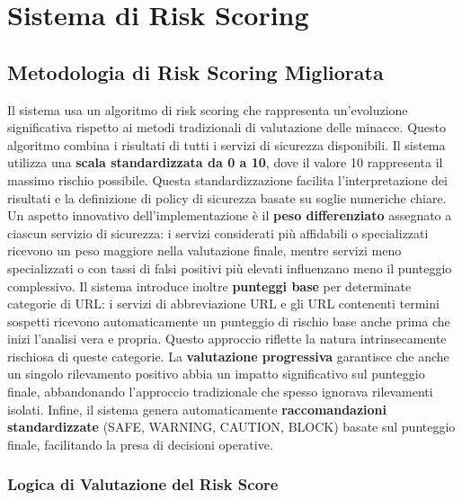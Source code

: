 \documentclass{article}
\begin{document}
\section{Sistema di Risk Scoring}

\subsection{Metodologia di Risk Scoring Migliorata}

Il sistema usa un algoritmo di risk scoring che rappresenta un'evoluzione significativa rispetto ai metodi tradizionali di valutazione delle minacce. Questo algoritmo combina i risultati di tutti i servizi di sicurezza disponibili.
\newline \newline
Il sistema utilizza una \textbf{scala standardizzata da 0 a 10}, dove il valore 10 rappresenta il massimo rischio possibile. Questa standardizzazione facilita l'interpretazione dei risultati e la definizione di policy di sicurezza basate su soglie numeriche chiare.
\newline \newline
Un aspetto innovativo dell'implementazione è il \textbf{peso differenziato} assegnato a ciascun servizio di sicurezza: i servizi considerati più affidabili o specializzati ricevono un peso maggiore nella valutazione finale, mentre servizi meno specializzati o con tassi di falsi positivi più elevati influenzano meno il punteggio complessivo.
\newline \newline
Il sistema introduce inoltre \textbf{punteggi base} per determinate categorie di URL: i servizi di abbreviazione URL e gli URL contenenti termini sospetti ricevono automaticamente un punteggio di rischio base anche prima che inizi l'analisi vera e propria. Questo approccio riflette la natura intrinsecamente rischiosa di queste categorie.
\newline \newline
La \textbf{valutazione progressiva} garantisce che anche un singolo rilevamento positivo abbia un impatto significativo sul punteggio finale, abbandonando l'approccio tradizionale che spesso ignorava rilevamenti isolati. Infine, il sistema genera automaticamente \textbf{raccomandazioni standardizzate} (SAFE, WARNING, CAUTION, BLOCK) basate sul punteggio finale, facilitando la presa di decisioni operative.

\subsubsection{Logica di Valutazione del Risk Score}
\end{document}
